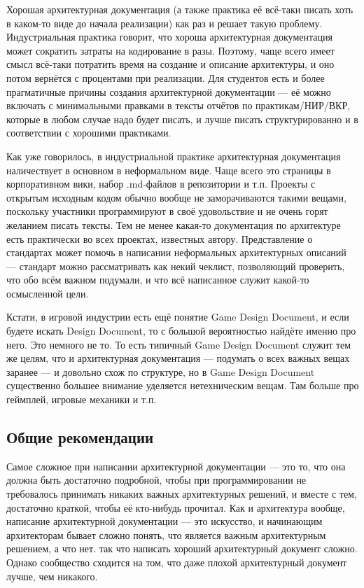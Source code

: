 \documentclass[a5paper]{article}
\begin{document}
Хорошая архитектурная документация (а также практика её всё-таки писать хоть в каком-то виде до начала реализации) как раз и решает такую проблему. Индустриальная практика говорит, что хороша архитектурная документация может сократить затраты на кодирование в разы. Поэтому, чаще всего имеет смысл всё-таки потратить время на создание и описание архитектуры, и оно потом вернётся с процентами при реализации. Для студентов есть и более прагматичные причины создания архитектурной документации --- её можно включать с минимальными правками в тексты отчётов по практикам/НИР/ВКР, которые в любом случае надо будет писать, и лучше писать структурированно и в соответствии с хорошими практиками.

Как уже говорилось, в индустриальной практике архитектурная документация наличествует в основном в неформальном виде. Чаще всего это страницы в корпоративном вики, набор .md-файлов в репозитории и т.п. Проекты с открытым исходным кодом обычно вообще не заморачиваются такими вещами, поскольку участники программируют в своё удовольствие и не очень горят желанием писать тексты. Тем не менее какая-то документация по архитектуре есть практически во всех проектах, известных автору. Представление о стандартах может помочь в написании неформальных архитектурных описаний --- стандарт можно рассматривать как некий чеклист, позволяющий проверить, что обо всём важном подумали, и что всё написанное служит какой-то осмысленной цели. 

Кстати, в игровой индустрии есть ещё понятие Game Design Document, и если будете искать Design Document, то с большой вероятностью найдёте именно про него. Это немного не то. То есть типичный Game Design Document служит тем же целям, что и архитектурная документация --- подумать о всех важных вещах заранее --- и довольно схож по структуре, но в Game Design Document существенно большее внимание уделяется нетехническим вещам. Там больше про геймплей, игровые механики и т.п.

\subsection{Общие рекомендации}

Самое сложное при написании архитектурной документации --- это то, что она должна быть достаточно подробной, чтобы при программировании не требовалось принимать никаких важных архитектурных решений, и вместе с тем, достаточно краткой, чтобы её кто-нибудь прочитал. Как и архитектура вообще, написание архитектурной документации --- это искусство, и начинающим архитекторам бывает сложно понять, что является важным архитектурным решением, а что нет. так что написать хороший архитектурный документ сложно. Однако сообщество сходится на том, что даже плохой архитектурный документ лучше, чем никакого.
\end{document}
